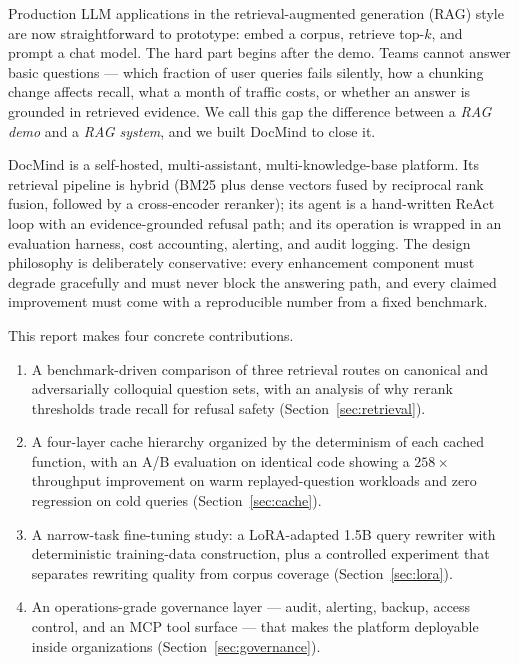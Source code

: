 \documentclass[11pt,a4paper]{article}
\begin{document}
Production LLM applications in the retrieval-augmented generation (RAG) style are now
straightforward to prototype: embed a corpus, retrieve top-$k$, and prompt a chat
model. The hard part begins after the demo. Teams cannot answer basic questions ---
which fraction of user queries fails silently, how a chunking change affects recall,
what a month of traffic costs, or whether an answer is grounded in retrieved evidence.
We call this gap the difference between a \emph{RAG demo} and a \emph{RAG system}, and
we built DocMind to close it.

DocMind is a self-hosted, multi-assistant, multi-knowledge-base platform. Its retrieval
pipeline is hybrid (BM25 plus dense vectors fused by reciprocal rank fusion, followed
by a cross-encoder reranker); its agent is a hand-written ReAct loop with an
evidence-grounded refusal path; and its operation is wrapped in an evaluation harness,
cost accounting, alerting, and audit logging. The design philosophy is deliberately
conservative: every enhancement component must degrade gracefully and must never block
the answering path, and every claimed improvement must come with a reproducible number
from a fixed benchmark.

This report makes four concrete contributions.
\begin{enumerate}
  \item A benchmark-driven comparison of three retrieval routes on canonical and
        adversarially colloquial question sets, with an analysis of why rerank
        thresholds trade recall for refusal safety (Section~\ref{sec:retrieval}).
  \item A four-layer cache hierarchy organized by the determinism of each cached
        function, with an A/B evaluation on identical code showing a $258\times$
        throughput improvement on warm replayed-question workloads and zero regression
        on cold queries (Section~\ref{sec:cache}).
  \item A narrow-task fine-tuning study: a LoRA-adapted 1.5B query rewriter with
        deterministic training-data construction, plus a controlled experiment that
        separates rewriting quality from corpus coverage (Section~\ref{sec:lora}).
  \item An operations-grade governance layer --- audit, alerting, backup, access
        control, and an MCP tool surface --- that makes the platform deployable inside
        organizations (Section~\ref{sec:governance}).
\end{enumerate}
\end{document}
